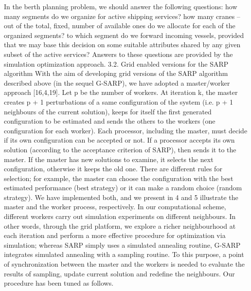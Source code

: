 
In the berth planning problem, we should answer the following questions:
 how many segments do we organize for active shipping services? 
 how many cranes – out of the total, fixed, number of available ones  do we allocate for each of the organized segments? 
 to which segment do we forward incoming vessels, provided that we may base this decision on some suitable attributes shared by any given subset of the active services? 
Answers to these questions are provided by the simulation optimization approach.
3.2. Grid enabled versions for the SARP algorithm
With the aim of developing grid versions of the SARP algorithm described above (in the sequel G-SARP),
we have adopted a master/worker approach [16,4,19].
Let p be the number of workers. At iteration k, the master creates p + 1 perturbations of a same configuration
of the system (i.e. p + 1 neighbours of the current solution), keeps for itself the first generated configuration
to be estimated and sends the others to the workers (one configuration for each worker). Each processor,
including the master, must decide if its own configuration can be accepted or not. If a processor accepts its
own solution (according to the acceptance criterion of SARP), then sends it to the master. If the master has
new solutions to examine, it selects the next configuration, otherwise it keeps the old one. There are different
rules for selection; for example, the master can choose the configuration with the best estimated performance
(best strategy) or it can make a random choice (random strategy). We have implemented both, and we present in
 4 and 5 illustrate the master and the worker process, respectively. In
our computational scheme, different workers carry out simulation experiments on different neighbours.
In other words, through the grid platform, we explore a richer neighbourhood at each iteration and perform
a more effective procedure for optimization via simulation; whereas SARP simply uses a simulated
annealing routine, G-SARP integrates simulated annealing with a sampling routine. To this purpose, a point
of synchronization between the master and the workers is needed to evaluate the results of sampling, update
current solution and redefine the neighbours.
Our procedure has been tuned as follows.



